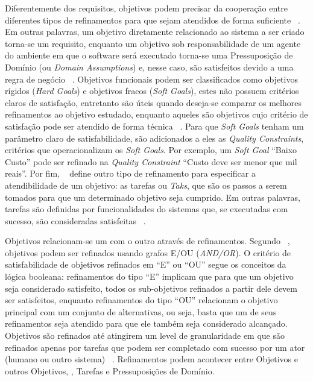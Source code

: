 Diferentemente dos requisitos, objetivos podem precisar da cooperação entre diferentes tipos de refinamentos para que sejam atendidos de forma suficiente ~\cite{dardenne1993goal}. Em outras palavras, um objetivo diretamente relacionado ao sistema a ser criado torna-se um requisito, enquanto um objetivo sob responsabilidade de um agente do ambiente em que o software será executado torna-se uma Pressuposição de Domínio (ou \textit{Domain Assumptions}) e, nesse caso, são satisfeitos devido a uma regra de negócio ~\cite{van2001goal, van1998managing}. Objetivos funcionais podem ser classificados como objetivos rígidos (\textit{Hard Goals}) e objetivos fracos (\textit{Soft Goals}), estes não possuem critérios claros de satisfação, entretanto são úteis quando deseja-se comparar os melhores refinamentos ao objetivo estudado, enquanto aqueles são objetivos cujo critério de satisfação pode ser atendido de forma técnica ~\cite{dardenne1993goal}. Para que \textit{Soft Goals} tenham um parâmetro claro de satisfabilidade, são adicionados a eles as \textit{Quality Constraints}, critérios que operacionalizam os \textit{Soft Goals}. Por exemplo, um \textit{Soft Goal} ``Baixo Custo'' pode ser refinado na \textit{Quality Constraint} ``Custo deve ser menor que mil reais''. Por fim, ~\cite{jureta2008revisiting} define outro tipo de refinamento para especificar a atendibilidade de um objetivo: as tarefas ou \textit{Taks}, que são os passos a serem tomados para que um determinado objetivo seja cumprido. Em outras palavras, tarefas são definidas por funcionalidades do sistemas que, se executadas com sucesso, são consideradas satisfeitas ~\cite{souza2012requirement}.

Objetivos relacionam-se um com o outro através de refinamentos. Segundo ~\cite{dardenne1991goal, dardenne1993goal}, objetivos podem ser refinados usando grafos E/OU (\textit{AND/OR}). O critério de satisfabilidade de objetivos refinados em ``E'' ou ``OU'' segue os conceitos da lógica booleana: refinamentos do tipo ``E'' implicam que para que um objetivo seja considerado satisfeito, todos os sub-objetivos refinados a partir dele devem ser satisfeitos, enquanto refinamentos do tipo ``OU'' relacionam o objetivo principal com um conjunto de alternativas, ou seja, basta que um de seus refinamentos seja atendido para que ele também seja considerado alcançado. Objetivos são refinados até atingirem um level de granularidade em que são refinados apenas por tarefas que podem ser completado com sucesso por um ator (humano ou outro sistema) ~\cite{souza2013awareness}. Refinamentos podem acontecer entre Objetivos e outros Objetivos, \sofgoals, Tarefas e Pressuposições de Domínio.

